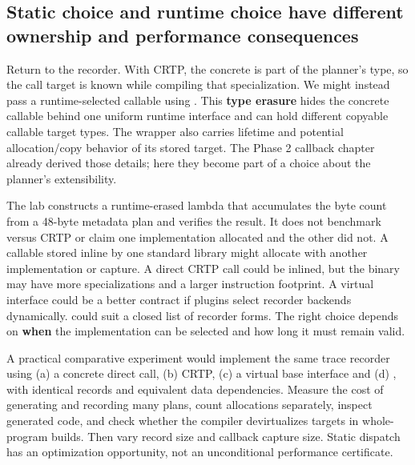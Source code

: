 \subsection{Static choice and runtime choice have different ownership and performance consequences}\label{01-foundations-i-ch005-static-choice-and-runtime-choice-have-different-ownership-and-performance-consequences}

\hypertarget{01-foundations-i-ch005-static-choice-and-runtime-choice-have-different-ownership-and-performance-consequences}{}

Return to the recorder. With CRTP, the concrete  is part of the planner's type, so the call target is known while compiling that specialization. We might instead pass a runtime-selected callable using . This \textbf{type erasure} hides the concrete callable behind one uniform runtime interface and can hold different copyable callable target types. The wrapper also carries lifetime and potential allocation/copy behavior of its stored target. The Phase 2 callback chapter already derived those details; here they become part of a choice about the planner's extensibility.

The lab constructs a runtime-erased lambda that accumulates the byte count from a 48-byte metadata plan and verifies the result. It does not benchmark  versus CRTP or claim one implementation allocated and the other did not. A callable stored inline by one standard library might allocate with another implementation or capture. A direct CRTP call could be inlined, but the binary may have more specializations and a larger instruction footprint. A virtual interface could be a better contract if plugins select recorder backends dynamically.  could suit a closed list of recorder forms. The right choice depends on \textbf{when} the implementation can be selected and how long it must remain valid.

A practical comparative experiment would implement the same trace recorder using (a) a concrete direct call, (b) CRTP, (c) a virtual base interface and (d) , with identical records and equivalent data dependencies. Measure the cost of generating and recording many plans, count allocations separately, inspect generated code, and check whether the compiler devirtualizes targets in whole-program builds. Then vary record size and callback capture size. Static dispatch has an optimization opportunity, not an unconditional performance certificate.

